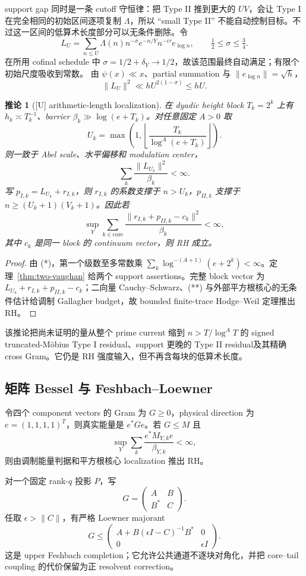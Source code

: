 \documentclass[UTF8,11pt,a4paper]{ctexart}
\newtheorem{corollary}[theorem]{推论}
\theoremstyle{definition}
\theoremstyle{remark}
\newcommand{\1}{\mathbf 1}
\newcommand{\statusU}{\textnormal{[U]}}
\begin{document}
support gap 同时是一条 cutoff 守恒律：把 Type II 推到更大的 $UV$，会让 Type I 在完全相同的初始区间逐项复制 $\Lambda$，所以 ``small Type II'' 不能自动控制目标。不过这一区间的低算术长度部分可以无条件删除。令
\[
 L_U=\sum_{n\leq U}\Lambda(n)n^{-\sigma}e^{-n/Y}n^{-i\tau}e_{\log n},
 \qquad \tfrac12\leq\sigma\leq\tfrac34.
\]
在所用 cofinal schedule 中 $\sigma=1/2+\delta_Y\to1/2$，故该范围最终自动满足；有限个初始尺度吸收到常数。
由 $\psi(x)\ll x$、partial summation 与 $\|e_{\log n}\|=\sqrt h$，
\[
 \|L_U\|^2\ll hU^{2(1-\sigma)}\leq hU.           \tag{*}
\]

\begin{corollary}[\statusU{} arithmetic-length localization]\label{cor:length-local}
在 dyadic height block $T_k=2^k$ 上有 $h_k\asymp T_k^{-1}$、barrier $\beta_k\gg\log(e+T_k)$。对任意固定 $A>0$ 取
\[
 U_k=\max\!\left(1,\left\lfloor
 \frac{T_k}{\log^A(e+T_k)}\right\rfloor\right).
\]
则一致于 Abel scale、水平偏移和 modulation center，
\[
 \sum_k\frac{\|L_{U_k}\|^2}{\beta_k}<\infty.
\]
写 $p_{I,k}=L_{U_k}+r_{I,k}$，则 $r_{I,k}$ 的系数支撑于 $n>U_k$，$p_{II,k}$ 支撑于 $n\geq(U_k+1)(V_k+1)$。因此若
\[
 \sup_Y\sum_{k\in\mathrm{core}}
 \frac{\|r_{I,k}+p_{II,k}-c_k\|^2}{\beta_k}<\infty,              \tag{**}
\]
其中 $c_k$ 是同一 block 的 continuum vector，则 RH 成立。
\end{corollary}

\begin{proof}
由 (*)，第一个级数至多常数乘
$\sum_k\log^{-(A+1)}(e+2^k)<\infty$。定理~\ref{thm:two-vaughan} 给两个 support assertions。完整 block vector 为 $L_{U_k}+r_{I,k}+p_{II,k}-c_k$；二向量 Cauchy--Schwarz、(**) 与外部平方根核心的无条件估计给调制 Gallagher budget，故 bounded finite-trace Hodge--Weil 定理推出 RH。
\end{proof}

该推论把尚未证明的量从整个 prime current 缩到 $n>T/\log^A T$ 的 signed truncated-M\"obius Type I residual、support 更晚的 Type II residual及其精确 cross Gram。它仍是 RH 强度输入，但不再含每块的低算术长度。
\subsection{矩阵 Bessel 与 Feshbach--Loewner}

令四个 component vectors 的 Gram 为 $G\geq0$，physical direction 为 $e=(1,1,1,1)^T$，则真实能量是 $e^*Ge$。若 $G\leq M$ 且
\[
  \sup_Y\sum_k\frac{e^*M_{Y,k}e}{\beta_{Y,k}}<\infty,
\]
则由调制能量判据和平方根核心 localization 推出 RH。

对一个固定 rank-$q$ 投影 $P$，写
\[
  G=\begin{pmatrix}A&B\\B^*&C\end{pmatrix}.
\]
任取 $\epsilon>\|C\|$，有严格 Loewner majorant
\[
 G\leq
 \begin{pmatrix}
 A+B(\epsilon I-C)^{-1}B^*&0\\0&\epsilon I
 \end{pmatrix}.
\]
这是 upper Feshbach completion；它允许公共通道不逐块对角化，并把 core--tail coupling 的代价保留为正 resolvent correction。
\end{document}
